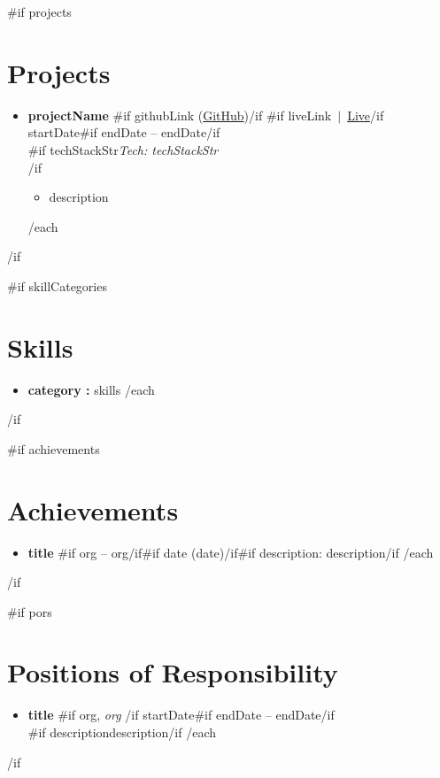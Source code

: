 \documentclass[11pt,a4paper]{article}
\newcommand{\resumeItem}[1]{\item\small{#1}}
\newcommand{\link}[2]{\href{#1}{#2}}
\begin{document}
{{#if projects}}
\section{Projects}
\begin{itemize}[leftmargin=0pt, label={}]
{{#each projects}}
  \item
    \textbf{ {{projectName}} }%
    {{#if githubLink}} (\link{ {{githubLink}} }{GitHub}){{/if}}%
    {{#if liveLink}}\ $|$\ \link{ {{liveLink}} }{Live}{{/if}}
    \hfill
    \textcolor{muted}{\small{}{{startDate}}{{#if endDate}} -- {{endDate}}{{/if}} }\\
    {{#if techStackStr}}\textcolor{muted}{\small\textit{Tech: {{techStackStr}} }}\\[2pt]{{/if}}
    \begin{itemize}[leftmargin=12pt]
      \resumeItem{\small{}{{description}} }
    \end{itemize}
  \vspace{4pt}
{{/each}}
\end{itemize}
{{/if}}

{{#if skillCategories}}
\section{Skills}
\begin{itemize}[leftmargin=0pt, label={}]
{{#each skillCategories}}
  \item \textbf{ {{category}} :} {{skills}}
{{/each}}
\end{itemize}
{{/if}}

{{#if achievements}}
\section{Achievements}
\begin{itemize}[leftmargin=12pt]
{{#each achievements}}
  \resumeItem{\textbf{ {{title}} }{{#if org}} -- {{org}}{{/if}}{{#if date}} ({{date}}){{/if}}{{#if description}}: {{description}}{{/if}} }
{{/each}}
\end{itemize}
{{/if}}

{{#if pors}}
\section{Positions of Responsibility}
\begin{itemize}[leftmargin=0pt, label={}]
{{#each pors}}
  \item
    \textbf{ {{title}} }{{#if org}}, \textit{ {{org}} }{{/if}}
    \hfill
    \textcolor{muted}{\small{}{{startDate}}{{#if endDate}} -- {{endDate}}{{/if}} }\\
    {{#if description}}\small{}{{description}}{{/if}}
  \vspace{2pt}
{{/each}}
\end{itemize}
{{/if}}
\end{document}

